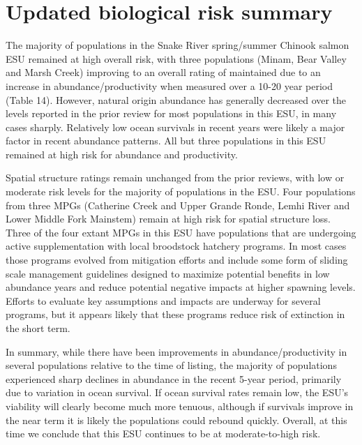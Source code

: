 \documentclass[
  letterpaper,
  oneside,
  open=any]{scrbook}
\begin{document}
\hypertarget{updated-biological-risk-summary-2}{%
\section{Updated biological risk
summary}\label{updated-biological-risk-summary-2}}

The majority of populations in the Snake River spring/summer Chinook
salmon ESU remained at high overall risk, with three populations (Minam,
Bear Valley and Marsh Creek) improving to an overall rating of
maintained due to an increase in abundance/productivity when measured
over a 10-20 year period (Table 14). However, natural origin abundance
has generally decreased over the levels reported in the prior review for
most populations in this ESU, in many cases sharply. Relatively low
ocean survivals in recent years were likely a major factor in recent
abundance patterns. All but three populations in this ESU remained at
high risk for abundance and productivity.

Spatial structure ratings remain unchanged from the prior reviews, with
low or moderate risk levels for the majority of populations in the ESU.
Four populations from three MPGs (Catherine Creek and Upper Grande
Ronde, Lemhi River and Lower Middle Fork Mainstem) remain at high risk
for spatial structure loss. Three of the four extant MPGs in this ESU
have populations that are undergoing active supplementation with local
broodstock hatchery programs. In most cases those programs evolved from
mitigation efforts and include some form of sliding scale management
guidelines designed to maximize potential benefits in low abundance
years and reduce potential negative impacts at higher spawning levels.
Efforts to evaluate key assumptions and impacts are underway for several
programs, but it appears likely that these programs reduce risk of
extinction in the short term.

In summary, while there have been improvements in abundance/productivity
in several populations relative to the time of listing, the majority of
populations experienced sharp declines in abundance in the recent 5-year
period, primarily due to variation in ocean survival. If ocean survival
rates remain low, the ESU's viability will clearly become much more
tenuous, although if survivals improve in the near term it is likely the
populations could rebound quickly. Overall, at this time we conclude
that this ESU continues to be at moderate-to-high risk.

\end{document}
